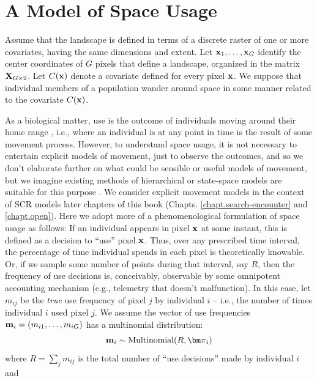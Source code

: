 \section{A Model of Space Usage}

\label{rsf.sec.rsfmodel}


Assume that the landscape is defined in terms of a discrete raster of
one or more covariates, having the same dimensions and extent.  Let
${\bf x}_{1},\ldots,{\bf x}_{G}$ identify the center coordinates of
$G$ pixels that define a landscape, organized in the
 matrix ${\bf X}_{G \times 2}$.  Let $C({\bf x})$ denote a
covariate defined for every pixel ${\bf x}$.  We suppose
that individual members of a population wander around space in some
manner related to the covariate $C({\bf x})$.

As a biological matter, use is the outcome of individuals moving
around their home range \citep{hooten_etal:2010}, i.e., where an
individual is at any point in time is the result of some movement
process. However, to understand space usage, it is not necessary to
entertain explicit models of movement, just to observe the outcomes,
and so we don't elaborate further on what could be sensible or useful
models of movement, but we imagine existing methods of hierarchical or
state-space models are suitable for this purpose
\citep{ovaskainen:2004, jonsen_etal:2005, forester_etal:2007,
  ovaskainen_etal:2008, patterson_etal:2008, hooten_etal:2010,
  mcclintock_etal:2012}.  We consider explicit movement models in the
context of SCR models later chapters of this book
(Chapts. \ref{chapt.search-encounter} and \ref{chapt.open}).  Here we
adopt more of a phenomenological formulation of space usage as
follows: If an individual appears in pixel ${\bf x}$ at some instant,
this is defined as a decision to ``use'' pixel ${\bf
  x}$.
Thus, over
any prescribed time interval, the percentage of time individual spends
in each pixel is theoretically knowable. Or, if we sample some number
of points during that interval, say $R$,
then the frequency of use decisions is,
 conceivably, observable by some
omnipotent accounting mechanism (e.g., telemetry that doesn't malfunction).
In this
case, let $m_{ij}$ be the {\it true} use frequency of pixel $j$ by
individual $i$ -- i.e., the number of times individual $i$ used pixel
$j$.  We assume the vector of use frequencies ${\bf m}_{i} =
(m_{i1},\ldots,m_{iG})$ has a multinomial distribution:
\[
{\bf m}_{i} \sim \mbox{Multinomial}(R, {\bm \pi}_{i})
\]
where $R = \sum_{j} m_{ij}$ is the total number of ``use decisions''
made by individual $i$ and
